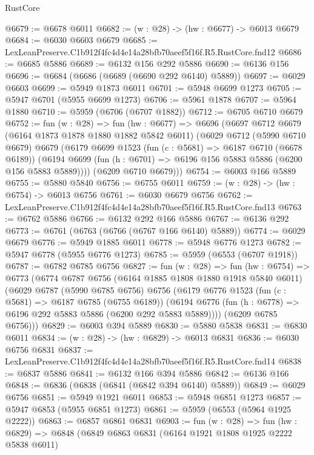 \begin{lexlean}{RustCore}
\begin{coremodule}
@6679 := @6678 @6011
@6682 := (w : @28) -> (hw : @6677) -> @6013 @6679
@6684 := @6030 @6603 @6679
@6685 := LexLeanPreserve.C1b912f4fc4d4e14a28bfb70aeef5f16f.R5.RustCore.fnd12
@6686 := @6685 @5886
@6689 := @6132 @156 @292 @5886
@6690 := @6136 @156
@6696 := @6684 (@6686 (@6689 (@6690 @292 @6140) @5889))
@6697 := @6029 @6603
@6699 := @5949 @1873 @6011
@6701 := @5948 @6699 @1273
@6705 := @5947 @6701 (@5955 @6699 @1273)
@6706 := @5961 @1878
@6707 := @5964 @1880
@6710 := @5959 (@6706 (@6707 @1882))
@6712 := @6705 @6710 @6679
@6752 := fun (w : @28) =>
  fun (hw : @6677) =>
  @6696
    (@6697
      @6712
      @6679
      (@6164 @1873 @1878 @1880 @1882 @5842 @6011)
      (@6029
        @6712
        (@5990 @6710 @6679)
        @6679
        (@6179
          @6699
          @1523
          (fun (c : @5681) => @6187 @6710 (@6678 @6189))
          (@6194 @6699 (fun (h : @6701) => @6196 @156 @5883 @5886 (@6200 @156 @5883 @5889))))
        (@6209 @6710 @6679)))
@6754 := @6003 @166 @5889
@6755 := @5880 @5840
@6756 := @6755 @6011
@6759 := (w : @28) -> (hw : @6754) -> @6013 @6756
@6761 := @6030 @6679 @6756
@6762 := LexLeanPreserve.C1b912f4fc4d4e14a28bfb70aeef5f16f.R5.RustCore.fnd13
@6763 := @6762 @5886
@6766 := @6132 @292 @166 @5886
@6767 := @6136 @292
@6773 := @6761 (@6763 (@6766 (@6767 @166 @6140) @5889))
@6774 := @6029 @6679
@6776 := @5949 @1885 @6011
@6778 := @5948 @6776 @1273
@6782 := @5947 @6778 (@5955 @6776 @1273)
@6785 := @5959 (@6553 (@6707 @1918))
@6787 := @6782 @6785 @6756
@6827 := fun (w : @28) =>
  fun (hw : @6754) =>
  @6773
    (@6774
      @6787
      @6756
      (@6164 @1885 @1808 @1880 @1918 @5840 @6011)
      (@6029
        @6787
        (@5990 @6785 @6756)
        @6756
        (@6179
          @6776
          @1523
          (fun (c : @5681) => @6187 @6785 (@6755 @6189))
          (@6194 @6776 (fun (h : @6778) => @6196 @292 @5883 @5886 (@6200 @292 @5883 @5889))))
        (@6209 @6785 @6756)))
@6829 := @6003 @394 @5889
@6830 := @5880 @5838
@6831 := @6830 @6011
@6834 := (w : @28) -> (hw : @6829) -> @6013 @6831
@6836 := @6030 @6756 @6831
@6837 := LexLeanPreserve.C1b912f4fc4d4e14a28bfb70aeef5f16f.R5.RustCore.fnd14
@6838 := @6837 @5886
@6841 := @6132 @166 @394 @5886
@6842 := @6136 @166
@6848 := @6836 (@6838 (@6841 (@6842 @394 @6140) @5889))
@6849 := @6029 @6756
@6851 := @5949 @1921 @6011
@6853 := @5948 @6851 @1273
@6857 := @5947 @6853 (@5955 @6851 @1273)
@6861 := @5959 (@6553 (@5964 @1925 @2222))
@6863 := @6857 @6861 @6831
@6903 := fun (w : @28) =>
  fun (hw : @6829) =>
  @6848
    (@6849
      @6863
      @6831
      (@6164 @1921 @1808 @1925 @2222 @5838 @6011)

\end{coremodule}
\end{lexlean}
